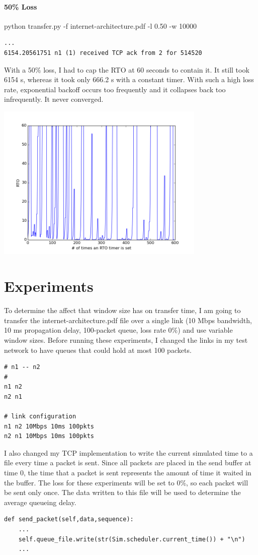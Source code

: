 \documentclass[11pt]{article}
\begin{document}
\paragraph{50\% Loss}
python transfer.py -f internet-architecture.pdf -l 0.50 -w 10000
\begin{lstlisting}
...
6154.20561751 n1 (1) received TCP ack from 2 for 514520
\end{lstlisting}
With a 50\% loss, I had to cap the RTO at 60 seconds to contain it. It still took 6154 s, whereas it took only 666.2 s with a constant timer. With such a high loss rate, exponential backoff occurs too frequently and it collapses back too infrequently. It never converged.

\includegraphics[width=10cm]{../graphs/timeout_50.png}

\pagebreak
\section{Experiments}
To determine the affect that window size has on transfer time, I am going to transfer the internet-architecture.pdf file over a single link (10 Mbps bandwidth, 10 ms propagation delay, 100-packet queue, loss rate 0\%) and use variable window sizes. Before running these experiments, I changed the links in my test network to have queues that could hold at most 100 packets.
\begin{lstlisting}
# n1 -- n2
#
n1 n2
n2 n1

# link configuration
n1 n2 10Mbps 10ms 100pkts
n2 n1 10Mbps 10ms 100pkts
\end{lstlisting}
I also changed my TCP implementation to write the current simulated time to a file every time a packet is sent. Since all packets are placed in the send buffer at time 0, the time that a packet is sent represents the amount of time it waited in the buffer. The loss for these experiments will be set to 0\%, so each packet will be sent only once. The data written to this file will be used to determine the average queueing delay.
\begin{lstlisting}
def send_packet(self,data,sequence):
	...
	self.queue_file.write(str(Sim.scheduler.current_time()) + "\n")
	...
\end{lstlisting}
\end{document}

